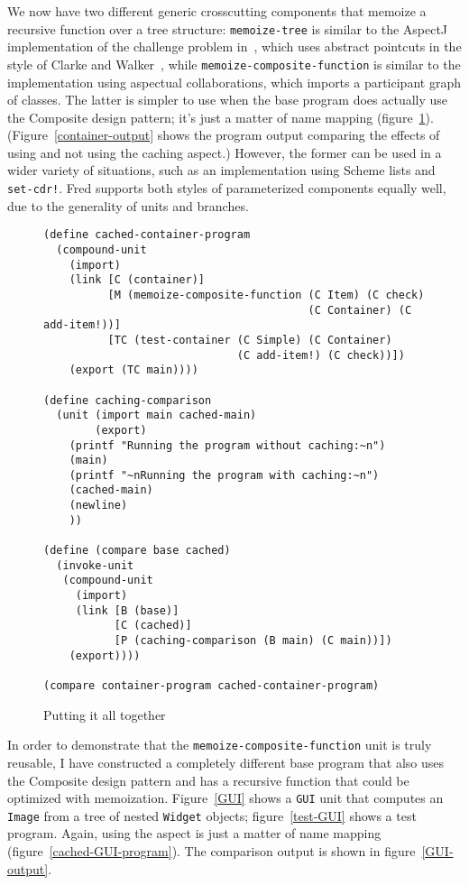 \documentclass{article}
\newcommand{\code}[1]{\texttt{#1}}
\begin{document}
We now have two different generic crosscutting components that memoize
a recursive function over a tree structure: \code{memoize-tree} is
similar to the AspectJ implementation of the challenge problem
in~\cite{acc}, which uses abstract pointcuts in the style of Clarke
and Walker~\cite{comp-patt}, while \code{memoize-composite-function}
is similar to the implementation using aspectual collaborations, which
imports a participant graph of classes.  The latter is simpler to use
when the base program does actually use the Composite design pattern;
it's just a matter of name mapping
(figure~\ref{cached-container-program}).
(Figure~\ref{container-output} shows the program output comparing the
effects of using and not using the caching aspect.)  However, the
former can be used in a wider variety of situations, such as an
implementation using Scheme lists and \code{set-cdr!}.  Fred supports
both styles of parameterized components equally well, due to the
generality of units and branches.

\begin{figure}
\caption{Putting it all together}
\label{cached-container-program}
\begin{verbatim}
(define cached-container-program
  (compound-unit
    (import)
    (link [C (container)]
          [M (memoize-composite-function (C Item) (C check)
                                         (C Container) (C add-item!))]
          [TC (test-container (C Simple) (C Container)
                              (C add-item!) (C check))])
    (export (TC main))))

(define caching-comparison
  (unit (import main cached-main)
        (export)
    (printf "Running the program without caching:~n")
    (main)
    (printf "~nRunning the program with caching:~n")
    (cached-main)
    (newline)
    ))

(define (compare base cached)
  (invoke-unit
   (compound-unit
     (import)
     (link [B (base)]
           [C (cached)]
           [P (caching-comparison (B main) (C main))])
    (export))))

(compare container-program cached-container-program)
\end{verbatim}
\end{figure}

In order to demonstrate that the \code{memoize-composite-function}
unit is truly reusable, I have constructed a completely different base
program that also uses the Composite design pattern and has a
recursive function that could be optimized with memoization.
Figure~\ref{GUI} shows a \code{GUI} unit that computes an \code{Image}
from a tree of nested \code{Widget} objects; figure~\ref{test-GUI}
shows a test program.  Again, using the aspect is just a matter of
name mapping (figure~\ref{cached-GUI-program}).  The comparison output
is shown in figure~\ref{GUI-output}.
\end{document}
